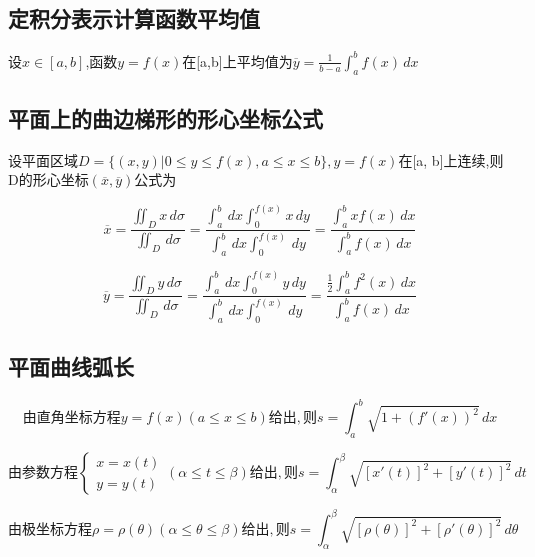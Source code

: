 \subsection{定积分表示计算函数平均值}

设\(x \in [a, b]\),函数\(y = f(x)\)在[a,b]上平均值为\(\overline{y} = \frac{1}{b- a} \int_{a}^{b} f(x) \,dx\)


\subsection{平面上的曲边梯形的形心坐标公式}

设平面区域\(D = \{ (x, y) | 0 \leq y \leq f(x), a \leq x \leq b \}, y = f(x)\)在[a, b]上连续,则D的形心坐标\((\overline{x}, \overline{y})\)公式为

\begin{displaymath}
\overline{x} = \frac{\iint_{D} x \,d\sigma}{\iint_{D} \,d\sigma} = 
\frac{\int_{a}^{b} \,dx \int_{0}^{f(x)} x \,dy}{\int_{a}^{b} \,dx \int_{0}^{f(x)} \,dy} =
\frac{\int_{a}^{b} xf(x) \,dx}{\int_{a}^{b} f(x) \,dx}
\end{displaymath}

\begin{displaymath}
\overline{y} = \frac{\iint_{D} y \,d\sigma}{\iint_{D} \,d\sigma} = 
\frac{\int_{a}^{b} \,dx \int_{0}^{f(x)} y \,dy}{\int_{a}^{b} \,dx \int_{0}^{f(x)} \,dy} =
\frac{\frac{1}{2}\int_{a}^{b} f^2(x) \,dx}{\int_{a}^{b} f(x) \,dx}
\end{displaymath}


\subsection{平面曲线弧长}

\begin{displaymath}
由直角坐标方程y = f(x)(a \leq x \leq b)给出,
则s = \int_{a}^{b} \sqrt{1 + (f'(x))^2} \,dx
\end{displaymath}

\begin{displaymath}
由参数方程
\begin{cases}
x = x(t) \\
y = y(t)
\end{cases}
(\alpha \leq t \leq \beta)给出,
则s = \int_{\alpha}^{\beta} \sqrt{[x'(t)]^2 + [y'(t)]^2} \,dt
\end{displaymath}

\begin{displaymath}
由极坐标方程\rho = \rho(\theta)(\alpha \leq \theta \leq \beta)给出,
则s = \int_{\alpha}^{\beta} \sqrt{[\rho(\theta)]^2 + [\rho'(\theta)]^2} \,d\theta
\end{displaymath}


